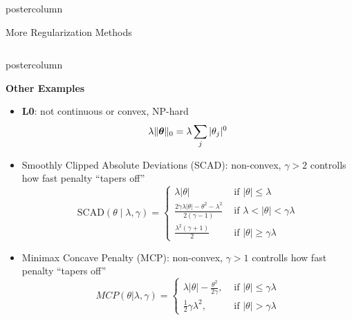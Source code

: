 \documentclass{beamer}
\newlength{\columnheight} %
\begin{document}
\begin{frame}[fragile]{}
\begin{columns}
\begin{column}{.31\textwidth}
\begin{beamercolorbox}[center]{postercolumn}
\begin{minipage}{.98\textwidth}
{\begin{myblock}{More Regularization Methods}
\end{myblock}

  
  }
  
  \end{minipage}
  \end{beamercolorbox}
  \end{column}
  
\end{columns}
\end{frame}

\begin{frame}[fragile]{}
\begin{columns}
	\begin{column}{.31\textwidth}
		\begin{beamercolorbox}[center]{postercolumn}
			\begin{minipage}{.98\textwidth}
				\parbox[t][\columnheight]{\textwidth}{

\begin{myblock}{}
        \begin{codebox}
\textbf{Other Examples}
\end{codebox}

\begin{itemize}[$\bullet$]
  \setlength{\itemindent}{+.3in}
\item \textbf{L0}: not continuous or convex, NP-hard
$$\lambda \|\bm{\theta}\|_0 = \lambda \sum_j |\theta_j|^0$$

\item Smoothly Clipped Absolute Deviations (SCAD): non-convex, $\gamma>2$ controlls how fast penalty ``tapers off''
$$
\text{SCAD}(\theta \mid \lambda, \gamma)= \begin{cases}\lambda|\theta| & \text { if }|\theta| \leq \lambda \\ \frac{2 \gamma \lambda|\theta|-\theta^2-\lambda^2}{2(\gamma-1)} & \text { if } \lambda<|\theta|<\gamma \lambda \\ \frac{\lambda^2(\gamma+1)}{2} & \text { if }|\theta| \geq \gamma \lambda\end{cases}
$$

\item Minimax Concave Penalty (MCP): non-convex, $\gamma>1$ controlls how fast penalty ``tapers off''
$$
MCP(\theta | \lambda, \gamma)= \begin{cases}\lambda|\theta|-\frac{\theta^2}{2 \gamma}, & \text { if }|\theta| \leq \gamma \lambda \\ \frac{1}{2} \gamma \lambda^2, & \text { if }|\theta|>\gamma \lambda\end{cases}
$$
\end{itemize}


\end{myblock}}
\end{minipage}
\end{beamercolorbox}
\end{column}
\end{columns}
\end{frame}
\end{document}
